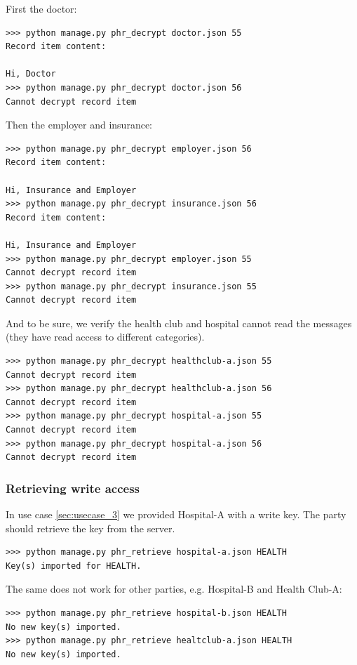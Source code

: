 \documentclass[a4paper]{article}
\begin{document}
			First the doctor:
			
			\begin{lstlisting}
>>> python manage.py phr_decrypt doctor.json 55
Record item content:

Hi, Doctor
>>> python manage.py phr_decrypt doctor.json 56
Cannot decrypt record item
			\end{lstlisting}

			Then the employer and insurance:

			\begin{lstlisting}
>>> python manage.py phr_decrypt employer.json 56
Record item content:

Hi, Insurance and Employer
>>> python manage.py phr_decrypt insurance.json 56
Record item content:

Hi, Insurance and Employer
>>> python manage.py phr_decrypt employer.json 55
Cannot decrypt record item
>>> python manage.py phr_decrypt insurance.json 55
Cannot decrypt record item
			\end{lstlisting}
			
			And to be sure, we verify the health club and hospital cannot read the messages (they have read access to different categories).

			\begin{lstlisting}
>>> python manage.py phr_decrypt healthclub-a.json 55
Cannot decrypt record item
>>> python manage.py phr_decrypt healthclub-a.json 56
Cannot decrypt record item
>>> python manage.py phr_decrypt hospital-a.json 55
Cannot decrypt record item
>>> python manage.py phr_decrypt hospital-a.json 56
Cannot decrypt record item
			\end{lstlisting}
		
		\subsubsection{Retrieving write access}\label{sec:usecase_6}
			In use case \ref{sec:usecase_3} we provided Hospital-A with a write key. The party should retrieve the key from the server.
			
			\begin{lstlisting}
>>> python manage.py phr_retrieve hospital-a.json HEALTH
Key(s) imported for HEALTH.
			\end{lstlisting}
			
			The same does not work for other parties, e.g. Hospital-B and Health Club-A:
		
			\begin{lstlisting}
>>> python manage.py phr_retrieve hospital-b.json HEALTH
No new key(s) imported.
>>> python manage.py phr_retrieve healtclub-a.json HEALTH
No new key(s) imported.
			\end{lstlisting}
		
\end{document}
